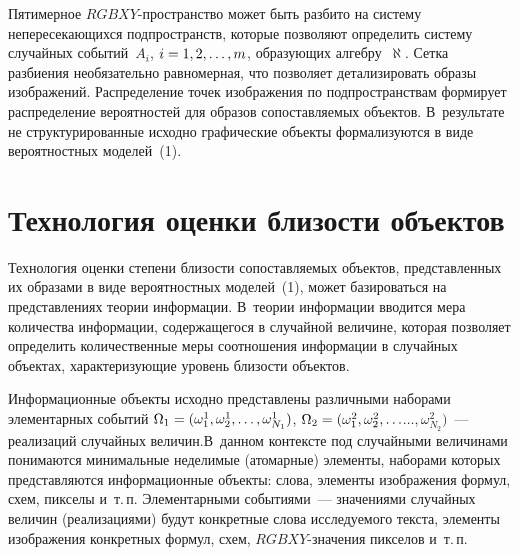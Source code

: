 \begin{multicols}{2}
  Пятимерное $RGBXY$-пространство может быть разбито на систему
непересекающихся подпространств, которые позволяют определить сис\-те\-му
случайных событий~$A_i$, $i\hm=1, 2, \ldots , m$, образующих
алгебру~$\aleph$. Сетка разбиения необязательно равномерная, что позволяет
детализировать образы изображений. Распределение точек изображения по
подпространствам формирует распределение вероятностей для образов
сопоставляемых объектов. В~результате не структурированные исходно
графические объекты формализуются в виде вероятностных моделей~(1).

\section{Технология оценки близости объектов}

  Технология оценки степени близости со\-по\-став\-ляемых объектов,
представленных их образами в виде вероятностных моделей~(1), может
базироваться на представлениях теории ин\-формации. В~тео\-рии информации
вводится мера количества информации, содержащегося в случайной величине,\linebreak
которая позволяет определить количественные меры соотношения информации
в случайных объектах, характеризующие уровень близости объектов.

  Информационные объекты исходно пред\-став\-ле\-ны различными наборами
элементарных событий $\Omega_1\hm= (\omega^1_1, \omega^1_2,
\ldots , \omega^1_{N_1})$,  $\Omega_2\hm= (\omega_1^2,
\omega_2^2, \ldots$\linebreak $\ldots , \omega^2_{N_2})$~--- реализаций случайных
величин.\linebreak В~данном контексте под случайными величинами понимаются
минимальные неделимые (атомарные) элементы, наборами которых
пред\-став\-ля\-ют\-ся информационные объекты: слова, элементы изображения
формул, схем, пикселы и~т.\,п. Элементарными событиями~--- значениями
случайных величин (реализациями) будут конкретные слова исследуемого
текста, элементы изображения конкретных формул, схем,
  $RGBXY$-зна\-че\-ния пикселов и~т.\,п.


\end{multicols}

